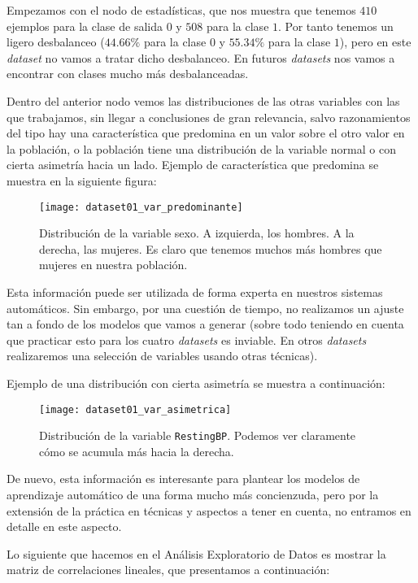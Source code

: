 \documentclass[11pt]{article}
\begin{document}
Empezamos con el nodo de estadísticas, que nos muestra que tenemos $410$ ejemplos para la clase de salida $0$ y $508$ para la clase $1$. Por tanto tenemos un ligero desbalanceo ($44.66\%$ para la clase $0$ y $55.34\%$ para la clase $1$), pero en este \emph{dataset} no vamos a tratar dicho desbalanceo. En futuros \emph{datasets} nos vamos a encontrar con clases mucho más desbalanceadas.

Dentro del anterior nodo vemos las distribuciones de las otras variables con las que trabajamos, sin llegar a conclusiones de gran relevancia, salvo razonamientos del tipo hay una característica que predomina en un valor sobre el otro valor en la población, o la población tiene una distribución de la variable normal o con cierta asimetría hacia un lado. Ejemplo de característica que predomina se muestra en la siguiente figura:

\begin{figure}[H]
    \centering
    \texttt{[image: dataset01\_var\_predominante]}
    \caption{Distribución de la variable sexo. A izquierda, los hombres. A la derecha, las mujeres. Es claro que tenemos muchos más hombres que mujeres en nuestra población.}
    \label{variable_predominante:imagen}
\end{figure}

Esta información puede ser utilizada de forma experta en nuestros sistemas automáticos. Sin embargo, por una cuestión de tiempo, no realizamos un ajuste tan a fondo de los modelos que vamos a generar (sobre todo teniendo en cuenta que practicar esto para los cuatro \emph{datasets} es inviable. En otros \emph{datasets} realizaremos una selección de variables usando otras técnicas).

Ejemplo de una distribución con cierta asimetría se muestra a continuación:

\begin{figure}[H]
    \centering
    \texttt{[image: dataset01\_var\_asimetrica]}
    \caption{Distribución de la variable \lstinline{RestingBP}. Podemos ver claramente cómo se acumula más hacia la derecha.}
\end{figure}

De nuevo, esta información es interesante para plantear los modelos de aprendizaje automático de una forma mucho más concienzuda, pero por la extensión de la práctica en técnicas y aspectos a tener en cuenta, no entramos en detalle en este aspecto.

Lo siguiente que hacemos en el Análisis Exploratorio de Datos es mostrar la matriz de correlaciones lineales, que presentamos a continuación:
\end{document}
